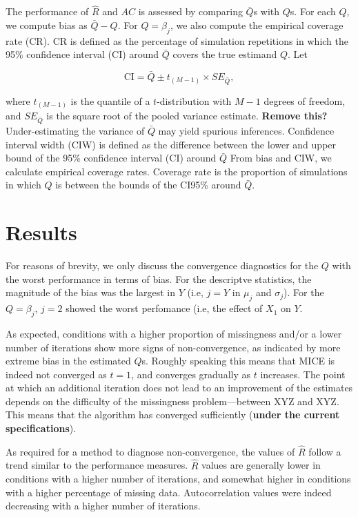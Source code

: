 \documentclass[Royal,times,sageh]{sagej}
\begin{document}
The performance of \(\widehat{R}\) and \(AC\) is assessed by comparing
\(\bar{Q}\)s with \(Q\)s. For each \(Q\), we compute bias as
\(\bar{Q} - Q\). For \(Q=\beta_j\), we also compute the empirical
coverage rate (CR). CR is defined as the percentage of simulation
repetitions in which the 95\% confidence interval (CI) around
\(\bar{Q}\) covers the true estimand \(Q\). Let

\[\text{CI} = \bar{Q} \pm t_{(M-1)} \times SE_{\bar{Q}},\]

where \(t_{(M-1)}\) is the quantile of a \(t\)-distribution with \(M-1\)
degrees of freedom, and \(SE_{\bar{Q}}\) is the square root of the
pooled variance estimate. \textbf{Remove this? } Under-estimating the
variance of \(\bar{Q}\) may yield spurious inferences. Confidence
interval width (CIW) is defined as the difference between the lower and
upper bound of the 95\% confidence interval (CI) around \(\bar{Q}\) From
bias and CIW, we calculate empirical coverage rates. Coverage rate is
the proportion of simulations in which \(Q\) is between the bounds of
the CI95\% around \(\bar{Q}\).

\hypertarget{results}{%
\section{Results}\label{results}}

For reasons of brevity, we only discuss the convergence diagnostics for
the \(Q\) with the worst performance in terms of bias. For the
descriptve statistics, the magnitude of the bias was the largest in
\(Y\) (i.e, \(j = Y\) in \(\mu_j\) and \(\sigma_j\)). For the
\(Q=\beta_j\), \(j=2\) showed the worst perfomance (i.e, the effect of
\(X_1\) on \(Y\).

As expected, conditions with a higher proportion of missingness and/or a
lower number of iterations show more signs of non-convergence, as
indicated by more extreme bias in the estimated \(Q\)s. Roughly speaking
this means that MICE is indeed not converged as \(t=1\), and converges
gradually as \(t\) increases. The point at which an additional iteration
does not lead to an improvement of the estimates depends on the
difficulty of the missingness problem---between XYZ and XYZ. This means
that the algorithm has converged sufficiently (\textbf{under the current
specifications}).

As required for a method to diagnose non-convergence, the values of
\(\widehat{R}\) follow a trend similar to the performance measures.
\(\widehat{R}\) values are generally lower in conditions with a higher
number of iterations, and somewhat higher in conditions with a higher
percentage of missing data. Autocorrelation values were indeed
decreasing with a higher number of iterations.
\end{document}
